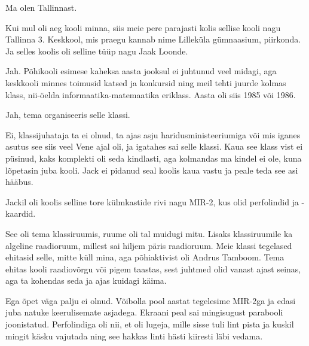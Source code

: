 
Ma olen Tallinnast.


Kui mul oli aeg kooli minna, siis 
meie pere parajasti kolis sellise kooli nagu Tallinna 3. 
Keskkool, mis praegu kannab nime
Lilleküla gümnaasium, piirkonda. Ja selles koolis oli 
selline tüüp nagu Jaak Loonde.


Jah. Põhikooli esimese kaheksa aasta jooksul ei 
juhtunud veel midagi, aga keskkooli minnes toimusid 
katsed ja konkursid ning meil tehti juurde kolmas klass, 
nii-öelda informaatika-matemaatika eriklass. Aasta oli siis 1985 või 1986.


Jah, tema organiseeris selle klassi.


Ei, klassijuhataja ta ei olnud, ta ajas asju haridusministeeriumiga või 
mis iganes asutus see siis veel Vene ajal oli, ja igatahes sai 
selle klassi. Kaua see klass vist ei püsinud, kaks 
komplekti oli seda kindlasti, aga kolmandas ma kindel ei ole, kuna 
lõpetasin juba kooli. Jack ei pidanud seal koolis kaua vastu ja peale 
teda see asi hääbus. 

Jackil oli koolis selline tore külmkastide rivi nagu 
MIR-2, kus olid perfolindid ja -kaardid.


See oli tema klassiruumis, ruume oli tal muidugi mitu. Lisaks 
klassiruumile ka algeline raadioruum, millest sai hiljem päris raadioruum. 
Meie klassi tegelased ehitasid selle, mitte küll mina, aga põhiaktivist oli Andrus Tamboom. Tema ehitas kooli 
raadiovõrgu või pigem taastas, sest juhtmed olid vanast 
ajast seinas, aga ta kohendas seda ja ajas kuidagi käima.


Ega õpet väga palju ei olnud. Võibolla pool aastat tegelesime
MIR-2ga ja edasi juba natuke 
keerulisemate asjadega. Ekraani peal sai mingisugust parabooli
joonistatud. Perfolindiga oli nii, et oli lugeja, mille sisse tuli lint pista
ja kuskil mingit käsku vajutada ning see hakkas linti hästi 
kiiresti läbi vedama.


